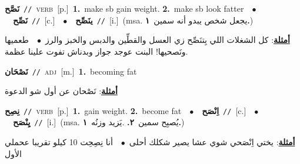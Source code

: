 \documentclass[10pt,a4paper,twoside]{article} %
\begin{document}
\begin{multicols}{2}
{\setlength\topsep{0pt}\textbf{\foreignlanguage{arabic}{نَصَّح}}\ {\color{gray}\texttt{//}\color{black}}\ \textsc{verb}\ [p.]\ \textbf{1.}~make sb gain weight.  \textbf{2.}~make sb look fatter\ \ $\bullet$\ \ \setlength\topsep{0pt}\textbf{\foreignlanguage{arabic}{نَصِّح}}\ {\color{gray}\texttt{//}\color{black}}\ [c.]\ \ $\bullet$\ \ \setlength\topsep{0pt}\textbf{\foreignlanguage{arabic}{ينَصِّح}}\ {\color{gray}\texttt{//}\color{black}}\ [i.]\ \color{gray}(msa. \foreignlanguage{arabic}{يجعل شخص يبدو أنه سمين}~\foreignlanguage{arabic}{\textbf{١.}})\color{black}\  \begin{flushright}\color{gray}\foreignlanguage{arabic}{\textbf{\underline{\foreignlanguage{arabic}{أمثلة}}}: كل الشغلات اللي بِتنَصِّح زي العسل والقطِّين والدبس والخبز والرز\ $\bullet$\ \  طعميها ونَصحيها! البنت عوجد جواز وبدناش تفوت علينا عظمة.}\end{flushright}\color{black}} \vspace{2mm}

{\setlength\topsep{0pt}\textbf{\foreignlanguage{arabic}{نَصْحَان}}\ {\color{gray}\texttt{//}\color{black}}\ \textsc{adj}\ [m.]\ \textbf{1.}~becoming fat\  \begin{flushright}\color{gray}\foreignlanguage{arabic}{\textbf{\underline{\foreignlanguage{arabic}{أمثلة}}}: نَصْحان عن أول شو الدعوة}\end{flushright}\color{black}} \vspace{2mm}

{\setlength\topsep{0pt}\textbf{\foreignlanguage{arabic}{نِصِح}}\ {\color{gray}\texttt{//}\color{black}}\ \textsc{verb}\ [p.]\ \textbf{1.}~gain weight.  \textbf{2.}~become fat\ \ $\bullet$\ \ \setlength\topsep{0pt}\textbf{\foreignlanguage{arabic}{اِنْصَح}}\ {\color{gray}\texttt{//}\color{black}}\ [c.]\ \ $\bullet$\ \ \setlength\topsep{0pt}\textbf{\foreignlanguage{arabic}{يِنْصَح}}\ {\color{gray}\texttt{//}\color{black}}\ [i.]\ \color{gray}(msa. \foreignlanguage{arabic}{يُصبِح سمين}~\foreignlanguage{arabic}{\textbf{٢.}}  .\foreignlanguage{arabic}{يَزيد وزنُه}~\foreignlanguage{arabic}{\textbf{١.}})\color{black}\  \begin{flushright}\color{gray}\foreignlanguage{arabic}{\textbf{\underline{\foreignlanguage{arabic}{أمثلة}}}: يختي اِنْصَحي شوي عشا يصير شكلك أحلى\ $\bullet$\ \  أنا نِصِحِت 10 كيلو تقريبا عحملي الأول}\end{flushright}\color{black}} \vspace{2mm}


\end{multicols}
\end{document}
